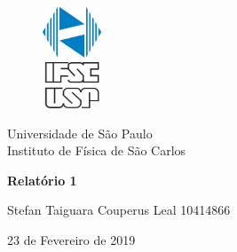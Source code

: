 \documentclass[a4paper, 12pt]{article}
\begin{document}

\begin{titlepage} 

\begin{figure}[H]
\centering
\includegraphics[width=1.75cm]{IFSC_USP.png} %

\end{figure}
    \begin{center}
        Universidade de São Paulo \\
        
        Instituto de Física de São Carlos \\


\vspace{10pt}

        
        \vspace{85pt}
        
        
         \large\textbf{{Relatório 1}} %
        \vspace{160pt}
        
    \end{center}
    
    \begin{flushright}
        
         Stefan Taiguara Couperus Leal 10414866 \\ %
    \end{flushright}
    
    \begin{center}
        \vspace{\fill}
        23 de Fevereiro de 2019 %
    \end{center}
\end{titlepage}

\newpage
\tableofcontents    %

\thispagestyle{empty}

\newpage
{}

\end{document}
